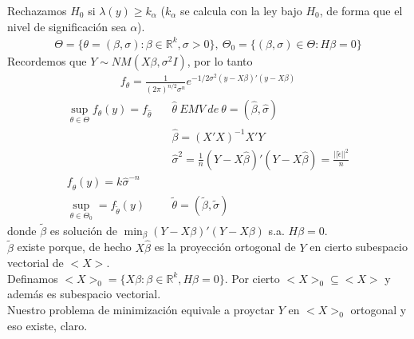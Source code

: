\documentclass[10pt]{article}
\theoremstyle{plain}
\theoremstyle{definition}
\begin{document}
Rechazamos $H_{0}$ si $\lambda(y) \ge k_{\alpha}$ ($k_{\alpha}$ se calcula con la ley bajo $H_{0}$, de forma que el nivel de significación sea $\alpha$).
\begin{align*}
\Theta = \{\theta = (\beta,\sigma)\colon \beta \in \mathbb{R}^k, \sigma > 0 \},\ \Theta_{0} = \{(\beta,\sigma)\in \Theta \colon H\beta = 0\}
\end{align*}
Recordemos que $Y \sim NM(X\beta, \sigma^2I)$, por lo tanto
\begin{align*}
f_{\theta} = \frac{1}{(2\pi)^{n/2}\sigma^n}e^{-1/2\sigma^2 (y- X\beta)'(y-X\beta)}
\end{align*}
\begin{align*}
\sup_{\theta\in \Theta} f_{\theta}(y) = f_{\hat{\theta}} &\quad \hat{\theta}\ EMV\ de\ \theta= (\hat{\beta},\hat{\sigma})\\
&\quad \hat{\beta} = (X'X)^{-1}X'Y\\
&\quad \hat{\sigma}^2 = \frac{1}{n}(Y-X\hat{\beta})'(Y-X\hat{\beta}) = \frac{||\hat{\epsilon}||^2}{n}\\
f_{\hat{\theta}}(y) = k \hat{\sigma}^{-n}\\
\sup_{\theta\in\Theta_{0}} = f_{\tilde{\theta}}(y) &\quad \tilde{\theta} = (\tilde{\beta},\tilde{\sigma})
\end{align*}
donde $\tilde{\beta}$ es solución de $\min_{\beta} (Y-X\beta)'(Y-X\beta)$ s.a. $H\beta= 0$.\\

$\tilde{\beta}$ existe porque, de hecho $X\hat{\beta}$ es la proyección ortogonal de $Y$ en cierto subespacio vectorial de $<X>$.\\

Definamos $<X>_{0} = \{X\beta \colon \beta \in \mathbb{R}^k, H\beta = 0\}$. Por cierto $<X>_{0}\subseteq <X>$ y además es subespacio vectorial.\\

Nuestro problema de minimización equivale a proyctar $Y$ en $<X>_{0}$ ortogonal y eso existe, claro.\\
\end{document}
